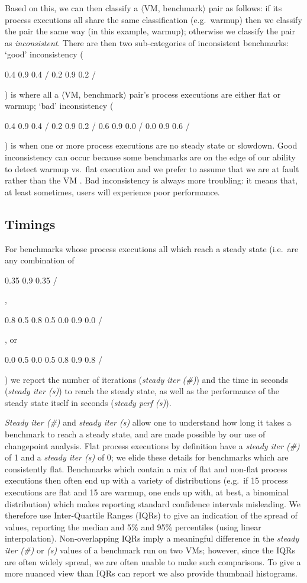 \documentclass[acmlarge]{acmart}\settopmatter{printfolios=true}
\newcommand{\vmbpair}{$\langle$VM, benchmark$\rangle$\xspace}
\DeclareRobustCommand{\flatc}{%
\setlength{\sparklinethickness}{0.4pt}%
\begin{sparkline}{1.5}
\spark 0.1 0.35
       0.9 0.35
       /%
\end{sparkline}\xspace%
}
\DeclareRobustCommand{\warmup}{%
\setlength{\sparklinethickness}{0.4pt}%
\begin{sparkline}{1.5}
\spark 0.1 0.8
       0.5 0.8
       0.5 0.0
       0.9 0.0
       /%
\end{sparkline}\xspace%
}
\DeclareRobustCommand{\slowdown}{%
\setlength{\sparklinethickness}{0.4pt}%
\begin{sparkline}{1.5}
\spark 0.1 0.0
       0.5 0.0
       0.5 0.8
       0.9 0.8
       /%
\end{sparkline}\xspace%
}
\DeclareRobustCommand{\badinconsistent}{%
\setlength{\sparklinethickness}{0.4pt}%
\begin{sparkline}{1.5}
\spark 0.1 0.4
       0.9 0.4
       /%
\spark 0.1 0.2
       0.9 0.2
       /%
\spark 0.1 0.6
       0.9 0.0
       /%
\spark 0.1 0.0
       0.9 0.6
       /%
\end{sparkline}\xspace%
}
\DeclareRobustCommand{\goodinconsistent}{%
\setlength{\sparklinethickness}{0.4pt}%
\begin{sparkline}{1.5}
\spark 0.1 0.4
       0.9 0.4
       /%
\spark 0.1 0.2
       0.9 0.2
       /%
\end{sparkline}\xspace%
}
\begin{document}
Based on this, we can then classify a \vmbpair pair as follows:
if its process executions all share the same classification (e.g.~warmup) then
we classify the pair the same way (in this example, warmup); otherwise we classify the pair as
\emph{inconsistent}. There are then two sub-categories of inconsistent
benchmarks: `good' inconsistency (\goodinconsistent) is where all a \vmbpair pair's process
executions are either flat or warmup; `bad' inconsistency (\badinconsistent) is
when one or more process executions are no steady state or slowdown. Good inconsistency
can occur because some benchmarks are on the edge of our ability to detect warmup
vs.~flat execution and we prefer to assume that we are at fault rather
than the VM . Bad inconsistency is always more troubling: it
means that, at least sometimes, users will experience poor performance.


\subsection{Timings}

For benchmarks whose process executions all which reach a steady state (i.e.~are
any combination of \flatc, \warmup, or \slowdown) we report the number of
iterations (\emph{steady iter (\#)}) and the time in seconds (\emph{steady iter (s)}) to
reach the steady state, as well as the performance of the steady state itself in
seconds (\emph{steady perf (s)}).

\emph{Steady iter (\#)} and \emph{steady iter (s)} allow one to understand how long it takes
a benchmark to reach a steady state, and are made possible by our use of changepoint
analysis. Flat process executions by definition have a \emph{steady iter (\#)} of 1 and
a \emph{steady iter (s)} of 0; we elide these details for benchmarks
which are consistently flat. Benchmarks which contain a mix of flat and non-flat
process executions then often end up with a variety of distributions (e.g.~if 15
process executions are flat and 15 are warmup, one ends up with, at best, a
binominal distribution) which makes reporting standard confidence intervals
misleading. We therefore use Inter-Quartile Ranges (IQRs) to give an indication of the
spread of values, reporting the median and 5\% and 95\% percentiles (using
linear interpolation). Non-overlapping IQRs imply a meaningful difference in the \emph{steady iter (\#)} or
\emph{(s)} values of a benchmark run on two VMs; however, since the IQRs are often
widely spread, we are often unable to make such comparisons. To give a more
nuanced view than IQRs can report we also provide thumbnail histograms.
\end{document}
